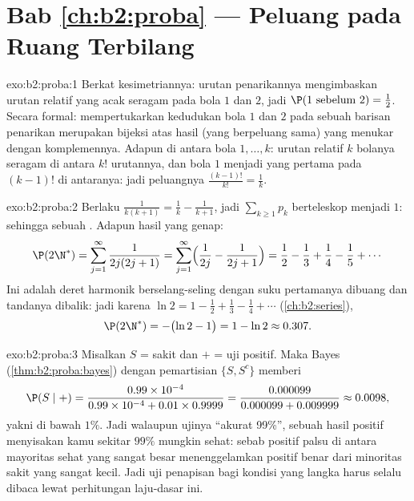 \section*{Bab \ref{ch:b2:proba} --- Peluang pada Ruang Terbilang}

\begin{solution}{exo:b2:proba:1}
Berkat kesimetriannya: urutan penarikannya mengimbaskan urutan relatif
yang acak seragam pada bola $1$ dan $2$, jadi $\P(1 \text{ sebelum } 2) =
\frac12$. Secara formal: mempertukarkan kedudukan bola $1$ dan $2$
pada sebuah barisan penarikan merupakan bijeksi atas hasil
(yang berpeluang sama) yang menukar  dengan komplemennya. Adapun di antara bola
$1, \dots, k$: urutan relatif $k$ bolanya seragam
di antara $k!$ urutannya, dan bola $1$ menjadi yang pertama pada $(k-1)!$
di antaranya: jadi peluangnya $\frac{(k-1)!}{k!} = \frac1k$.
\end{solution}

\begin{solution}{exo:b2:proba:2}
Berlaku $\frac{1}{k(k+1)} = \frac1k - \frac1{k+1}$, jadi $\sum_{k\geq1} p_k$
berteleskop menjadi $1$: sehingga sebuah . Adapun hasil yang genap:
\[
\P(2\N^*) = \sum_{j=1}^{\infty}\frac{1}{2j(2j+1)}
= \sum_{j=1}^{\infty}\Bigl(\frac{1}{2j} - \frac{1}{2j+1}\Bigr)
= \frac12 - \frac13 + \frac14 - \frac15 + \cdots
\]
Ini adalah deret harmonik berselang-seling dengan suku pertamanya
dibuang dan tandanya dibalik: jadi karena $\ln 2 = 1 - \frac12 + \frac13 -
\frac14 + \cdots$ (\cref{ch:b2:series}),
\[
\P(2\N^*) = -\bigl(\ln 2 - 1\bigr) = 1 - \ln 2 \approx 0.307 .
\]
\end{solution}

\begin{solution}{exo:b2:proba:3}
Misalkan $S$ = sakit dan $+$ = uji positif. Maka Bayes
(\cref{thm:b2:proba:bayes}) dengan pemartisian $\{S, S^c\}$ memberi
\[
\P(S \mid +)
= \frac{0.99 \times 10^{-4}}
       {0.99 \times 10^{-4} + 0.01 \times 0.9999}
= \frac{0.000099}{0.000099 + 0.009999}
\approx 0.0098 ,
\]
yakni di bawah $1\%$. Jadi walaupun ujinya ``akurat 99\%'', sebuah hasil
positif menyisakan kamu sekitar $99\%$ mungkin sehat: sebab
positif palsu di antara mayoritas sehat yang sangat besar menenggelamkan
positif benar dari minoritas sakit yang sangat kecil. Jadi uji penapisan bagi
kondisi yang langka harus selalu dibaca lewat perhitungan laju-dasar
ini.
\end{solution}

